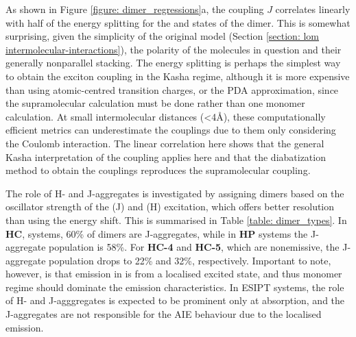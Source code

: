 As shown in  Figure \ref{figure: dimer_regressions}a, the coupling $J$ correlates linearly with half of the energy splitting for the \sone{} and \stwo{} states of the dimer. This is somewhat surprising, given the simplicity of the original model (Section \ref{section: lom intermolecular-interactions}), the polarity of the molecules in question and their generally nonparallel stacking. The energy splitting is perhaps the simplest way to obtain the exciton coupling in the Kasha regime, although it is more expensive than using atomic-centred transition charges, or the PDA approximation, since the supramolecular calculation must be done rather than one monomer calculation. At small intermolecular distances (\textless4{\AA}), these computationally efficient metrics can underestimate the couplings due to them only considering the Coulomb interaction.\cite{Kistler2013} The linear correlation here shows that the general Kasha interpretation of the coupling applies here and that the diabatization method to obtain the couplings reproduces the supramolecular coupling.

The role of H- and J-aggregates is investigated by assigning dimers based on the oscillator strength of the \sone{} (J) and \stwo{} (H) excitation, which offers better resolution than using the energy shift. This is summarised in Table \ref{table: dimer_types}.  In \textbf{HC}, systems, 60\% of dimers are J-aggregates, while in \textbf{HP} systems the J-aggregate population is 58\%. For \textbf{HC-4} and \textbf{HC-5}, which are nonemissive, the J-aggregate population drops to 22\% and 32\%, respectively. Important to note, however, is that emission in \Kstar{} is from a localised excited state, and thus monomer regime should dominate the emission characteristics. In ESIPT systems, the role of H- and J-agggregates is expected to be prominent only at absorption, and the J-aggregates are not responsible for the AIE behaviour due to the localised emission.

